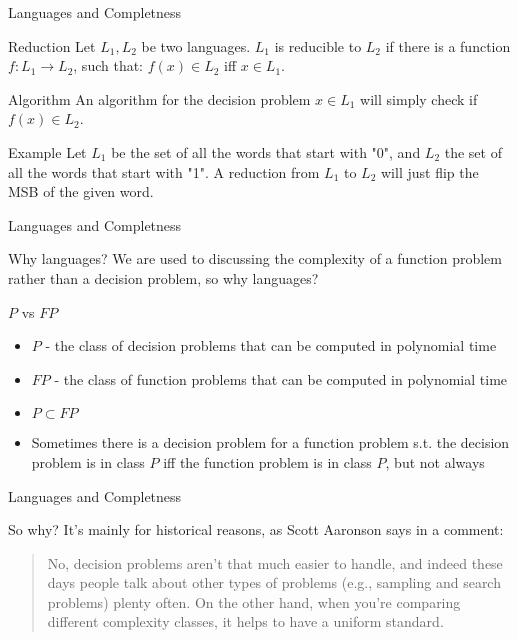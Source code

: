\documentclass[leqno,fleqn]{beamer}
\begin{document}
\begin{frame}[label=sec-1-4]{Languages and Completness}
\begin{block}{Reduction}
Let \(L_{1}, L_{2}\) be two languages. \(L_1\) is reducible to \(L_2\) if there is a
function \(f:L_1 \rightarrow L_2\), such that:
\(f(x) \in L_{2}\) iff \(x \in L_{1}\).
\end{block}
\begin{block}{Algorithm}
An algorithm for the decision problem \(x \in L_{1}\) will simply check if \(f(x) \in L_{2}\).
\end{block}
\begin{block}{Example}
Let \(L_{1}\) be the set of all the words that start with "0", and \(L_{2}\) the set of all the words that start with "1". A reduction from \(L_{1}\) to \(L_{2}\) will just flip the MSB of the given word.
\end{block}
\end{frame}
\begin{frame}[label=sec-1-5]{Languages and Completness}
\begin{block}{Why languages?}
We are used to discussing the complexity of a \alert{function problem} rather than a \alert{decision problem}, so why languages?
\end{block}
\begin{block}{\(P\) vs \(FP\)}
\begin{itemize}
\item \(P\) - the class of decision problems that can be computed in polynomial time
\item \(FP\) - the class of function problems that can be computed in polynomial time
\item \(P \subset FP\)
\item Sometimes there is a decision problem for a function problem s.t. the decision problem is in class \(P\) iff the function problem is in class \(P\), but not always
\end{itemize}
\end{block}
\end{frame}
\begin{frame}[label=sec-1-6]{Languages and Completness}
\begin{block}{So why?}
It's mainly for historical reasons, as Scott Aaronson says in a comment:
\begin{quote}
No, decision problems aren’t that much easier to handle, and indeed these days people talk about other types of problems (e.g., sampling and search problems) plenty often. On the other hand, when you’re comparing different complexity classes, it helps to have a uniform standard.
\end{quote}
\end{block}
\end{frame}
\end{document}
